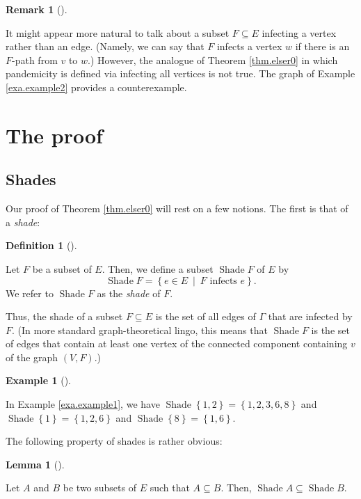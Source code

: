 \documentclass[numbers=enddot,12pt,final,onecolumn]{scrartcl}%
\theoremstyle{definition}
\newtheorem{lem}[theo]{Lemma}
\newenvironment{lemma}[1][]
{\begin{lem}[#1]\begin{leftbar}}
{\end{leftbar}\end{lem}}
\newtheorem{defi}[theo]{Definition}
\newenvironment{definition}[1][]
{\begin{defi}[#1]\begin{leftbar}}
{\end{leftbar}\end{defi}}
\newtheorem{remk}[theo]{Remark}
\newenvironment{remark}[1][]
{\begin{remk}[#1]\begin{leftbar}}
{\end{leftbar}\end{remk}}
\newtheorem{exam}[theo]{Example}
\newenvironment{example}[1][]
{\begin{exam}[#1]\begin{leftbar}}
{\end{leftbar}\end{exam}}
\begin{document}
\begin{remark}
It might appear more natural to talk about a subset $F\subseteq E$ infecting a
vertex rather than an edge. (Namely, we can say that $F$ infects a vertex $w$
if there is an $F$-path from $v$ to $w$.) However, the analogue of Theorem
\ref{thm.elser0} in which pandemicity is defined via infecting all vertices is
not true. The graph of Example \ref{exa.example2} provides a counterexample.
\end{remark}

\section{The proof}

\subsection{Shades}

Our proof of Theorem \ref{thm.elser0} will rest on a few notions. The first is
that of a \emph{shade}:

\begin{definition}
\label{def.Shade}Let $F$ be a subset of $E$. Then, we define a subset
$\operatorname*{Shade}F$ of $E$ by%
\begin{equation}
\operatorname*{Shade}F=\left\{  e\in E\ \mid\ F\text{ infects }e\right\}  .
\label{eq.def.Shade.eq}%
\end{equation}
We refer to $\operatorname*{Shade}F$ as the \emph{shade} of $F$.
\end{definition}

Thus, the shade of a subset $F\subseteq E$ is the set of all edges of $\Gamma$
that are infected by $F$. (In more standard graph-theoretical lingo, this
means that $\operatorname*{Shade}F$ is the set of edges that contain at least
one vertex of the connected component containing $v$ of the graph $\left(
V,F\right)  $.)

\begin{example}
In Example \ref{exa.example1}, we have $\operatorname*{Shade}\left\{
1,2\right\}  =\left\{  1,2,3,6,8\right\}  $ and $\operatorname*{Shade}\left\{
1\right\}  =\left\{  1,2,6\right\}  $ and $\operatorname*{Shade}\left\{
8\right\}  =\left\{  1,6\right\}  $.
\end{example}

The following property of shades is rather obvious:

\begin{lemma}
\label{lem.Shade-monoton}Let $A$ and $B$ be two subsets of $E$ such that
$A\subseteq B$. Then, $\operatorname*{Shade}A\subseteq\operatorname*{Shade}B$.
\end{lemma}
\end{document}
